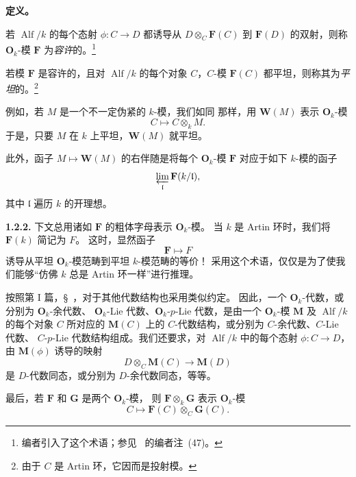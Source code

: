 \medskip
\noindent\textbf{定义。}
\label{sga3:VIIB:1.2.1-definitions}

\noindent\textit{}
若 \(\operatorname{Alf}/k\) 的每个态射 \(\phi:C\to D\) 都诱导从
\(D\otimes_C\mathbf F(C)\) 到 \(\mathbf F(D)\) 的双射，则称
\(\mathbf O_k\)-模 \(\mathbf F\) 为\emph{容许}的。\footnote{%
\label{sga3:VIIB:nde:43}编者引入了这个术语；参见\ 
的编者注~(47)。}

\smallskip
\noindent\textit{}
若模 \(\mathbf F\) 是容许的，且对 \(\operatorname{Alf}/k\) 的每个对象
\(C\)，\(C\)-模 \(\mathbf F(C)\) 都平坦，则称其为\emph{平坦}的。\footnote{%
\label{sga3:VIIB:nde:44}由于 \(C\) 是 Artin 环，它因而是投射模。}

例如，若 \(M\) 是一个不一定伪紧的 \(k\)-模，我们如同
 那样，用 \(\mathbf W(M)\)
表示 \(\mathbf O_k\)-模
\[
  C\longmapsto C\otimes_kM.
\]
于是，只要 \(M\) 在 \(k\) 上平坦，\(\mathbf W(M)\) 就平坦。

此外，函子 \(M\mapsto\mathbf W(M)\) 的右伴随是将每个
\(\mathbf O_k\)-模 \(\mathbf F\) 对应于如下 \(k\)-模的函子
\[
  \varprojlim_{\mathfrak l}\mathbf F(k/\mathfrak l),
\]
其中 \(\mathfrak l\) 遍历 \(k\) 的开理想。

\medskip
\noindent\textbf{1.2.2.}
\label{sga3:VIIB:1.2.2}
下文总用诸如 \(\mathbf F\) 的粗体字母表示 \(\mathbf O_k\)-模。
当 \(k\) 是 Artin 环时，我们将 \(\mathbf F(k)\) 简记为 \(F\)。
这时，显然函子
\[
  \mathbf F\longmapsto F
\]
诱导从平坦 \(\mathbf O_k\)-模范畴到平坦 \(k\)-模范畴的等价！
采用这个术语，仅仅是为了使我们能够“仿佛 \(k\) 总是 Artin 环一样”进行推理。

按照第 I 篇，\S~，对于其他代数结构也采用类似约定。
因此，一个 \(\mathbf O_k\)-代数，或分别为 \(\mathbf O_k\)-余代数、
\(\mathbf O_k\)-Lie 代数、\(\mathbf O_k\)-\(p\)-Lie 代数，是由一个
\(\mathbf O_k\)-模 \(\mathbf M\) 及 \(\operatorname{Alf}/k\) 的每个对象 \(C\) 所对应的
\(\mathbf M(C)\) 上的 \(C\)-代数结构，或分别为 \(C\)-余代数、\(C\)-Lie 代数、
\(C\)-\(p\)-Lie 代数结构组成。我们还要求，对 \(\operatorname{Alf}/k\)
中的每个态射 \(\phi:C\to D\)，由 \(\mathbf M(\phi)\) 诱导的映射
\[
  D\otimes_C\mathbf M(C)\longrightarrow\mathbf M(D)
\]
是 \(D\)-代数同态，或分别为 \(D\)-余代数同态，等等。

最后，若 \(\mathbf F\) 和 \(\mathbf G\) 是两个 \(\mathbf O_k\)-模，
则 \(\mathbf F\otimes_k\mathbf G\) 表示 \(\mathbf O_k\)-模
\[
  C\longmapsto\mathbf F(C)\otimes_C\mathbf G(C).
\]

